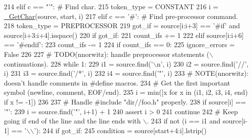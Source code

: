 \begin{DoxyCode}
{214         \textcolor{keywordflow}{elif} c == \textcolor{stringliteral}{"'"}:                           \textcolor{comment}{# Find char.}
215             token\_type = CONSTANT
216             i = \hyperlink{namespacecpp_1_1tokenize_abeb75f493bd3035922daf150f5213ba9}{\_GetChar}(source, start, i)
217         \textcolor{keywordflow}{elif} c == \textcolor{stringliteral}{'#'}:                           \textcolor{comment}{# Find pre-processor command.}
218             token\_type = PREPROCESSOR
219             got\_if = source[i:i+3] == \textcolor{stringliteral}{'#if'} \textcolor{keywordflow}{and} source[i+3:i+4].isspace()
220             \textcolor{keywordflow}{if} got\_if:
221                 count\_ifs += 1
222             \textcolor{keywordflow}{elif} source[i:i+6] == \textcolor{stringliteral}{'#endif'}:
223                 count\_ifs -= 1
224                 \textcolor{keywordflow}{if} count\_ifs == 0:
225                     ignore\_errors = \textcolor{keyword}{False}
226 
227             \textcolor{comment}{# TODO(nnorwitz): handle preprocessor statements (\(\backslash\) continuations).}
228             \textcolor{keywordflow}{while} 1:
229                 i1 = source.find(\textcolor{stringliteral}{'\(\backslash\)n'}, i)
230                 i2 = source.find(\textcolor{stringliteral}{'//'}, i)
231                 i3 = source.find(\textcolor{stringliteral}{'/*'}, i)
232                 i4 = source.find(\textcolor{stringliteral}{'"'}, i)
233                 \textcolor{comment}{# NOTE(nnorwitz): doesn't handle comments in #define macros.}
234                 \textcolor{comment}{# Get the first important symbol (newline, comment, EOF/end).}
235                 i = min([x \textcolor{keywordflow}{for} x \textcolor{keywordflow}{in} (i1, i2, i3, i4, end) \textcolor{keywordflow}{if} x != -1])
236 
237                 \textcolor{comment}{# Handle #include "dir//foo.h" properly.}
238                 \textcolor{keywordflow}{if} source[i] == \textcolor{stringliteral}{'"'}:
239                     i = source.find(\textcolor{stringliteral}{'"'}, i+1) + 1
240                     \textcolor{keyword}{assert} i > 0
241                     \textcolor{keywordflow}{continue}
242                 \textcolor{comment}{# Keep going if end of the line and the line ends with \(\backslash\).}
243                 \textcolor{keywordflow}{if} \textcolor{keywordflow}{not} (i == i1 \textcolor{keywordflow}{and} source[i-1] == \textcolor{stringliteral}{'\(\backslash\)\(\backslash\)'}):
244                     \textcolor{keywordflow}{if} got\_if:
245                         condition = source[start+4:i].lstrip()
}
\end{DoxyCode}
